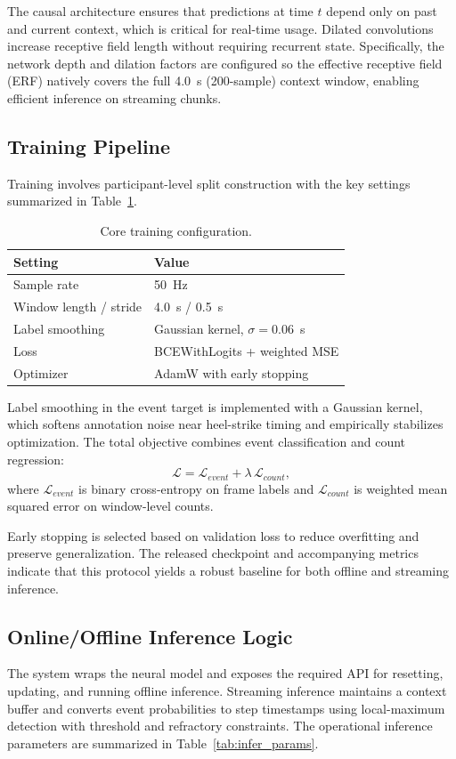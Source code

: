 The causal architecture ensures that predictions at time $t$ depend only on past and current context, which is critical for real-time usage. Dilated convolutions increase receptive field length without requiring recurrent state. Specifically, the network depth and dilation factors are configured so the effective receptive field (ERF) natively covers the full 4.0~s (200-sample) context window, enabling efficient inference on streaming chunks.

\subsection{Training Pipeline}
Training involves participant-level split construction with the key settings summarized in Table~\ref{tab:train_settings}.

\begin{table}[H]
\centering
\caption{Core training configuration.}
\label{tab:train_settings}
\small
\begin{tabular}{ll}
\toprule
Setting & Value \\
\midrule
Sample rate & 50~Hz \\
Window length / stride & 4.0~s / 0.5~s \\
Label smoothing & Gaussian kernel, $\sigma=0.06$~s \\
Loss & BCEWithLogits + weighted MSE \\
Optimizer & AdamW with early stopping \\
\bottomrule
\end{tabular}
\end{table}

Label smoothing in the event target is implemented with a Gaussian kernel, which softens annotation noise near heel-strike timing and empirically stabilizes optimization. The total objective combines event classification and count regression:
\begin{equation}
\mathcal{L}=\mathcal{L}_{event}+\lambda\,\mathcal{L}_{count},
\end{equation}
where $\mathcal{L}_{event}$ is binary cross-entropy on frame labels and $\mathcal{L}_{count}$ is weighted mean squared error on window-level counts.

Early stopping is selected based on validation loss to reduce overfitting and preserve generalization. The released checkpoint and accompanying metrics indicate that this protocol yields a robust baseline for both offline and streaming inference.

\subsection{Online/Offline Inference Logic}
The system wraps the neural model and exposes the required API for resetting, updating, and running offline inference. Streaming inference maintains a context buffer and converts event probabilities to step timestamps using local-maximum detection with threshold and refractory constraints. The operational inference parameters are summarized in Table~\ref{tab:infer_params}.

